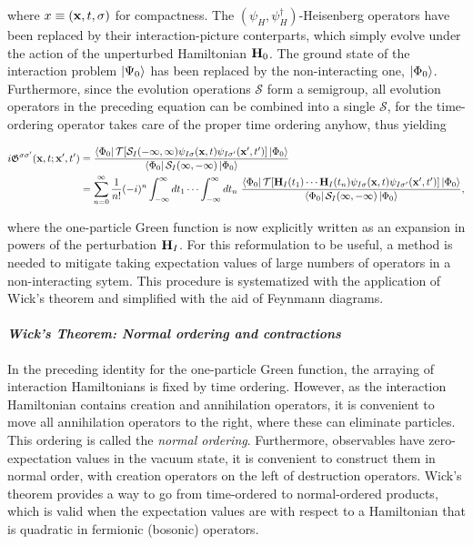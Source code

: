 \documentclass{homework}
\begin{document}
where $x \equiv ({\bf x}, t, \sigma)$ for compactness. The $(\psi_H, \psi_H^\dagger)$-Heisenberg operators have been replaced by their interaction-picture conterparts, which simply evolve under the action of the unperturbed Hamiltonian ${\bf H}_0$. The ground state of the interaction problem $\ket{\Psi_0}$ has been replaced by the non-interacting one, $\ket{\Phi_0}$. Furthermore, since the evolution operations $\mathcal{S}$ form a semigroup, all evolution operators in the preceding equation can be combined into a single $\mathcal{S}$, for the time-ordering operator takes care of the proper time ordering anyhow, thus yielding 

\begin{equation}
\begin{split}
     i \mathfrak{G}^{\sigma \sigma'}({\bf x}, t; {\bf x}', t') &= \frac{\bra{\Phi_0}  \mathcal{T} [\mathcal{S}_I(-\infty, \infty) \psi_{I \sigma}({\bf x}, t)\psi_{I \sigma'}({\bf x}', t')]\ket{\Phi_0}}{\bra{\Phi_0} \mathcal{S}_I(\infty, -\infty)\ket{\Phi_0}} \\
     &= \sum_{n=0}^{\infty} \frac{1}{n!} (-i)^n \int_{-\infty}^{\infty} dt_1 \cdots \int_{-\infty}^{\infty} dt_n \textnormal{ } \frac{\bra{\Phi_0} \mathcal{T} [{\bf H}_{I}(t_1) \cdots {\bf H}_{I}(t_n) \psi_{I \sigma}({\bf x}, t)\psi_{I \sigma'}({\bf x}', t')]\ket{\Phi_0}}{\bra{\Phi_0} \mathcal{S}_I(\infty, -\infty)\ket{\Phi_0}},
     \label{GF_perturbation_exp}
\end{split}
\end{equation}

where the one-particle Green function is now explicitly written as an expansion in powers of the perturbation ${\bf H}_I$. For this reformulation to be useful, a method is needed to mitigate taking expectation values of large numbers of operators in a non-interacting sytem. This procedure is systematized with the application of Wick's theorem and simplified with the aid of Feynmann diagrams. \\

\paragraph{\textit{Wick's Theorem: Normal ordering and contractions}}

In the preceding identity for the one-particle Green function, the arraying of interaction Hamiltonians is fixed by time ordering. However, as the interaction Hamiltonian contains creation and annihilation operators, it is convenient to move all annihilation operators to the right, where these can eliminate particles. This ordering is called the \textit{normal ordering}. Furthermore, observables have zero-expectation values in the vacuum state, it is convenient to construct them in normal order, with creation operators on the left of destruction operators. Wick's theorem provides a way to go from time-ordered to normal-ordered products, which is valid when the expectation values are with respect to a Hamiltonian that is quadratic in fermionic (bosonic) operators. \\
\end{document}
